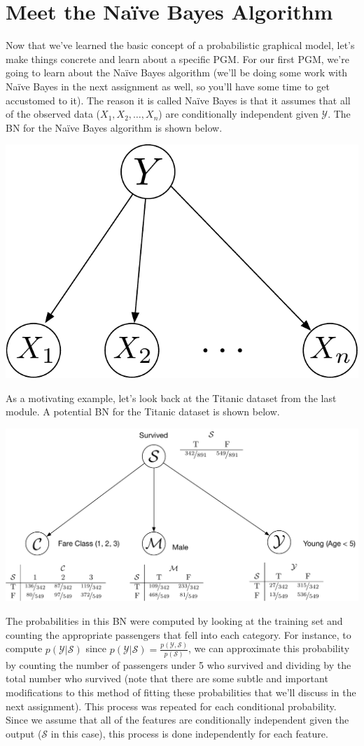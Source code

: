 \documentclass[assignment03_Solutions]{subfiles}
\begin{document}
\section{Meet the Na\"ive Bayes Algorithm}
Now that we've learned the basic concept of a probabilistic graphical model, let's make things concrete and learn about a specific PGM.  For our first PGM, we're going to learn about the Na\"ive Bayes algorithm (we'll be doing some work with Na\"ive Bayes in the next assignment as well, so you'll have some time to get accustomed to it).  The reason it is called Na\"ive Bayes is that it assumes that all of the observed data ($X_1, X_2, \ldots, X_n$) are conditionally independent given $\mathcal{Y}$.  The BN for the Na\"ive Bayes algorithm is shown below.
\begin{center}
\includegraphics[width=0.3\linewidth]{figures/naivebayesgm}
\end{center}

As a motivating example, let's look back at the Titanic dataset from the last module.  A potential BN for the Titanic dataset is shown below.

\begin{center}
\includegraphics[width=0.8\linewidth]{figures/titanicbn}
\end{center}

The probabilities in this BN were computed by looking at the training set and counting the appropriate passengers that fell into each category.  For instance, to compute $p(\mathcal{Y}|\mathcal{S})$ since $p(\mathcal{Y}|\mathcal{S}) = \frac{p(\mathcal{Y}, \mathcal{S})}{p(\mathcal{S})}$, we can approximate this probability by counting the number of passengers under 5 who survived and dividing by the total number who survived (note that there are some subtle and important modifications to this method of fitting these probabilities that we'll discuss in the next assignment).  This process was repeated for each conditional probability.  Since we assume that all of the features are conditionally independent given the output ($\mathcal{S}$ in this case), this process is done independently for each feature.
\end{document}
